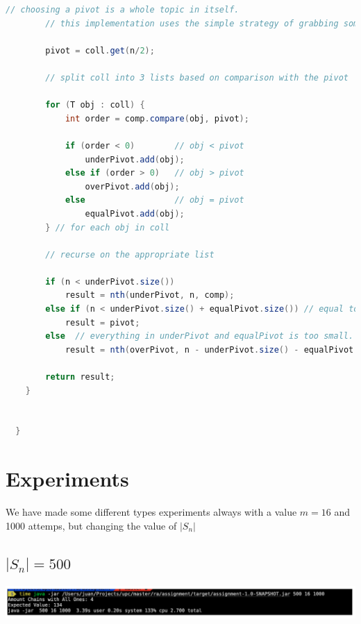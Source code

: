 \documentclass[12pt, a4paper]{article}
\begin{document}
\begin{enumerate}
\begin{lstlisting}[language=Java,caption={QuickSelect Algorithm},label={fn:quickselect}]
        // choosing a pivot is a whole topic in itself.
        // this implementation uses the simple strategy of grabbing something from the middle of the ArrayList.

        pivot = coll.get(n/2);

        // split coll into 3 lists based on comparison with the pivot

        for (T obj : coll) {
            int order = comp.compare(obj, pivot);

            if (order < 0)        // obj < pivot
                underPivot.add(obj);
            else if (order > 0)   // obj > pivot
                overPivot.add(obj);
            else                  // obj = pivot
                equalPivot.add(obj);
        } // for each obj in coll

        // recurse on the appropriate list

        if (n < underPivot.size())
            result = nth(underPivot, n, comp);
        else if (n < underPivot.size() + equalPivot.size()) // equal to pivot; just return it
            result = pivot;
        else  // everything in underPivot and equalPivot is too small.  Adjust n accordingly in the recursion.
            result = nth(overPivot, n - underPivot.size() - equalPivot.size(), comp);

        return result;
    }


  }

\end{lstlisting}

\end{enumerate}

\section{Experiments}\label{sec:exp}
We have made some different types experiments always with a value $m = 16$ and 1000 attemps, but changing the value of $|S_n|$

\subsection{$|S_n| = 500$}

\begin{minipage}[t]{\linewidth}
\includegraphics[width=\textwidth]{experiment1}
\label{fig:experiment1}
\end{minipage}
\end{document}

